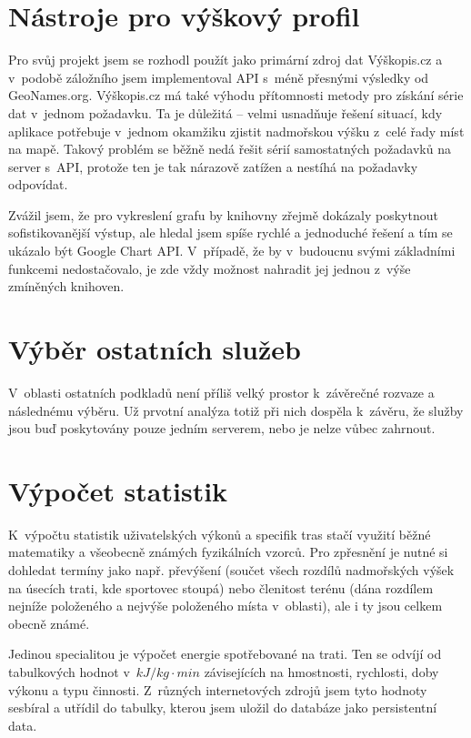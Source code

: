 \section{Nástroje pro výškový profil}
Pro svůj projekt jsem se rozhodl použít jako primární zdroj dat
Výškopis.cz a v~podobě záložního jsem implementoval API s~méně
přesnými výsledky od GeoNames.org. Výškopis.cz má také výhodu
přítomnosti metody pro získání série dat v~jednom požadavku. Ta je
důležitá -- velmi usnadňuje řešení situací, kdy aplikace potřebuje
v~jednom okamžiku zjistit nadmořskou výšku z~celé řady míst na mapě.
Takový problém se běžně nedá řešit sérií samostatných požadavků na
server s~API, protože ten je tak nárazově zatížen a nestíhá na
požadavky odpovídat.

Zvážil jsem, že pro vykreslení grafu by knihovny zřejmě dokázaly
poskytnout sofistikovanější výstup, ale hledal jsem spíše rychlé a
jednoduché řešení a tím se ukázalo být Google Chart API. V~případě,
že by v~budoucnu svými základními funkcemi nedostačovalo, je zde vždy
možnost nahradit jej jednou z~výše zmíněných knihoven.

\section{Výběr ostatních služeb}
V~oblasti ostatních podkladů není příliš velký prostor
k~závěrečné rozvaze a následnému výběru. Už prvotní analýza totiž při
nich dospěla k~závěru, že služby jsou buď poskytovány pouze jedním
serverem, nebo je nelze vůbec zahrnout.

\section{Výpočet statistik}
K~výpočtu statistik uživatelských výkonů a specifik tras stačí
využití běžné matematiky a všeobecně známých fyzikálních vzorců. Pro
zpřesnění je nutné si dohledat termíny jako např. převýšení (součet
všech rozdílů nadmořských výšek na úsecích trati, kde sportovec stoupá) nebo
členitost terénu (dána rozdílem nej\-níže položeného a nej\-výše
položeného místa v~oblasti), ale i ty jsou celkem obecně známé.

Jedinou specialitou je výpočet energie spotřebované na trati. Ten se
odvíjí od tabulkových hodnot v~$kJ / kg \cdot min$ závisejících na
hmostnosti, rychlosti, doby výkonu a typu činnosti. Z~různých
internetových zdrojů jsem tyto hodnoty sesbíral a utřídil do tabulky,
kterou jsem uložil do databáze jako persistentní data.


